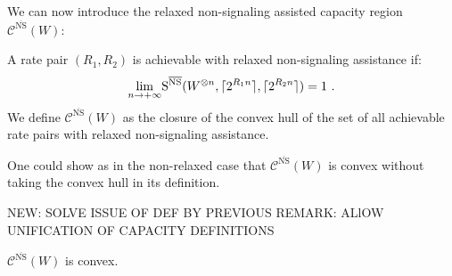   We can now introduce the relaxed non-signaling assisted capacity region $\mathcal{C}^{\overline{\mathrm{NS}}}(W)$:
  \begin{definition}
  A rate pair $(R_1,R_2)$ is achievable with relaxed non-signaling assistance if:
  \[ \underset{n \rightarrow +\infty}{\lim} \mathrm{S}^{\overline{\mathrm{NS}}}(W^{\otimes n},\lceil2^{R_1n}\rceil,\lceil2^{R_2n}\rceil) = 1 \ . \]
  We define $\mathcal{C}^{\overline{\mathrm{NS}}}(W)$ as the closure of the convex hull of the set of all achievable rate pairs with relaxed non-signaling assistance.
  \end{definition}

  \begin{rk}
    One could show as in the non-relaxed case that $\mathcal{C}^{\overline{\mathrm{NS}}}(W)$ is convex without taking the convex hull in its definition.
  \end{rk}

NEW: SOLVE ISSUE OF DEF BY PREVIOUS REMARK: ALlOW UNIFICATION OF CAPACITY DEFINITIONS
  \begin{proposition}
     $\mathcal{C}^{\overline{\mathrm{NS}}}(W)$ is convex. 
  \end{proposition}

